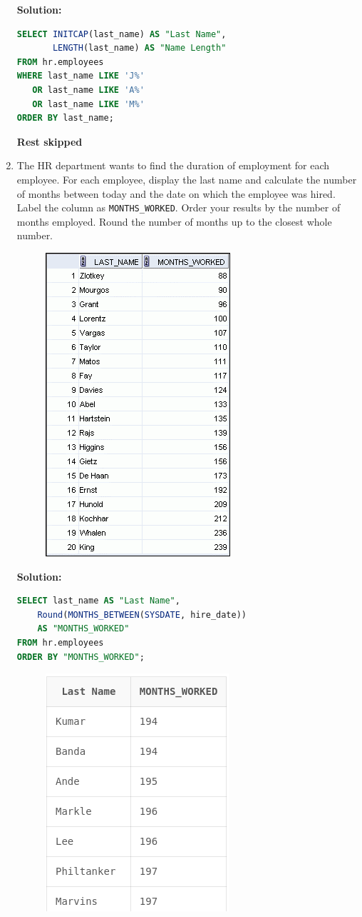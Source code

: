 \documentclass[a4paper,12pt]{article}
\begin{document}
\begin{enumerate}
\textbf{Solution: }
        \begin{lstlisting}[language=SQL, label={lst:employees_data}]
SELECT INITCAP(last_name) AS "Last Name",
       LENGTH(last_name) AS "Name Length"
FROM hr.employees
WHERE last_name LIKE 'J%' 
   OR last_name LIKE 'A%' 
   OR last_name LIKE 'M%'
ORDER BY last_name;
    \end{lstlisting}

    \textbf{Rest skipped}
\newpage
        \item The HR department wants to find the duration of employment for each employee. For each
employee, display the last name and calculate the number of months between today and the
date on which the employee was hired. Label the column as \texttt{MONTHS\_WORKED}. Order your
results by the number of months employed. Round the number of months up to the closest
whole number.
    \begin{figure}[h]
        \centering
        \includegraphics*[width=.4\linewidth]{graphics/36.png}
    \end{figure}

\textbf{Solution: }
        \begin{lstlisting}[language=SQL, label={lst:employees_data}]
SELECT last_name AS "Last Name",
    Round(MONTHS_BETWEEN(SYSDATE, hire_date))
    AS "MONTHS_WORKED"
FROM hr.employees
ORDER BY "MONTHS_WORKED"; 
    \end{lstlisting}
    \begin{figure}[h]
        \centering
        \includegraphics*[width=.31\linewidth]{graphics/36.1.png}
    \end{figure}
    \newpage
    

\end{enumerate}
\end{document}
